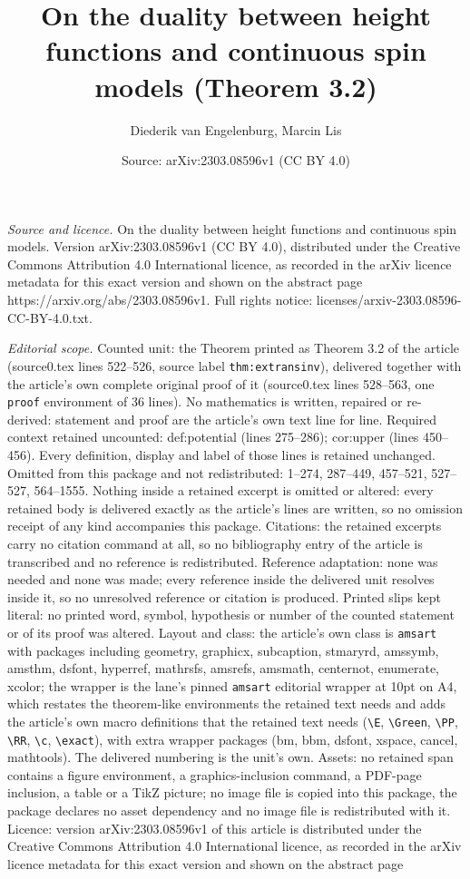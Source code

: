 \documentclass[10pt,a4paper]{amsart}
\title[On the duality between height functions and continuous spin ]{On the duality between height functions and continuous spin models (Theorem 3.2)}
\author{Diederik van Engelenburg, Marcin Lis}
\date{Source: arXiv:2303.08596v1 (CC BY 4.0)}
\begin{document}
\maketitle

\noindent\emph{Source and licence.} On the duality between height functions and continuous spin models. Version arXiv:2303.08596v1 (CC BY 4.0), distributed under the Creative Commons Attribution 4.0 International licence, as recorded in the arXiv licence metadata for this exact version and shown on the abstract page https://arxiv.org/abs/2303.08596v1. Full rights notice: licenses/arxiv-2303.08596-CC-BY-4.0.txt.\par\smallskip

\noindent\textit{Editorial scope.} Counted unit: the Theorem printed as Theorem 3.2 of the article (source0.tex lines 522--526, source label \texttt{thm:extransinv}), delivered together with the article's own complete original proof of it (source0.tex lines 528--563, one \texttt{proof} environment of 36 lines). No mathematics is written, repaired or re-derived: statement and proof are the article's own text line for line. Required context retained uncounted: def:potential (lines 275--286); cor:upper (lines 450--456). Every definition, display and label of those lines is retained unchanged. Omitted from this package and not redistributed: 1--274, 287--449, 457--521, 527--527, 564--1555. Nothing inside a retained excerpt is omitted or altered: every retained body is delivered exactly as the article's lines are written, so no omission receipt of any kind accompanies this package. Citations: the retained excerpts carry no citation command at all, so no bibliography entry of the article is transcribed and no reference is redistributed. Reference adaptation: none was needed and none was made; every reference inside the delivered unit resolves inside it, so no unresolved reference or citation is produced. Printed slips kept literal: no printed word, symbol, hypothesis or number of the counted statement or of its proof was altered. Layout and class: the article's own class is \texttt{amsart} with packages including geometry, graphicx, subcaption, stmaryrd, amssymb, amsthm, dsfont, hyperref, mathrsfs, amsrefs, amsmath, centernot, enumerate, xcolor; the wrapper is the lane's pinned \texttt{amsart} editorial wrapper at 10pt on A4, which restates the theorem-like environments the retained text needs and adds the article's own macro definitions that the retained text needs (\texttt{\textbackslash E}, \texttt{\textbackslash Green}, \texttt{\textbackslash PP}, \texttt{\textbackslash RR}, \texttt{\textbackslash c}, \texttt{\textbackslash exact}), with extra wrapper packages (bm, bbm, dsfont, xspace, cancel, mathtools). The delivered numbering is the unit's own. Assets: no retained span contains a figure environment, a graphics-inclusion command, a PDF-page inclusion, a table or a TikZ picture; no image file is copied into this package, the package declares no asset dependency and no image file is redistributed with it. Licence: version arXiv:2303.08596v1 of this article is distributed under the Creative Commons Attribution 4.0 International licence, as recorded in the arXiv licence metadata for this exact version and shown on the abstract page 
\end{document}
